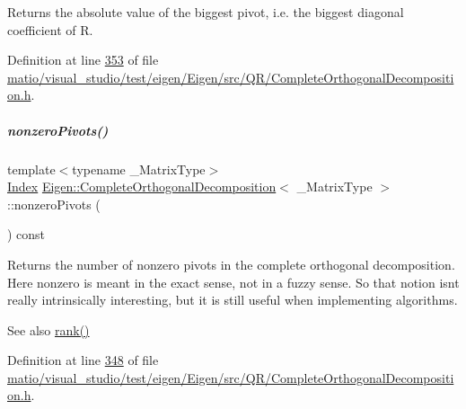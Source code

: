\begin{DoxyReturn}{Returns}
the absolute value of the biggest pivot, i.\+e. the biggest diagonal coefficient of R. 
\end{DoxyReturn}


Definition at line \hyperlink{matio_2visual__studio_2test_2eigen_2_eigen_2src_2_q_r_2_complete_orthogonal_decomposition_8h_source_l00353}{353} of file \hyperlink{matio_2visual__studio_2test_2eigen_2_eigen_2src_2_q_r_2_complete_orthogonal_decomposition_8h_source}{matio/visual\+\_\+studio/test/eigen/\+Eigen/src/\+Q\+R/\+Complete\+Orthogonal\+Decomposition.\+h}.

\mbox{\label{group___q_r___module_af9d7a5bdbc16a4a0bf7394ef0dd208da}} 
\subparagraph{\texorpdfstring{nonzero\+Pivots()}{nonzeroPivots()}\hspace{0.1cm}{\footnotesize\ttfamily [1/2]}}
{\footnotesize\ttfamily template$<$typename \+\_\+\+Matrix\+Type$>$ \\
\hyperlink{namespace_eigen_a62e77e0933482dafde8fe197d9a2cfde}{Index} \hyperlink{group___q_r___module_class_eigen_1_1_complete_orthogonal_decomposition}{Eigen\+::\+Complete\+Orthogonal\+Decomposition}$<$ \+\_\+\+Matrix\+Type $>$\+::nonzero\+Pivots (\begin{DoxyParamCaption}{ }\end{DoxyParamCaption}) const\hspace{0.3cm}{\ttfamily [inline]}}

\begin{DoxyReturn}{Returns}
the number of nonzero pivots in the complete orthogonal decomposition. Here nonzero is meant in the exact sense, not in a fuzzy sense. So that notion isn\textquotesingle{}t really intrinsically interesting, but it is still useful when implementing algorithms.
\end{DoxyReturn}
\begin{DoxySeeAlso}{See also}
\hyperlink{group___q_r___module_af348f64b26f8467a020062c22b748806}{rank()} 
\end{DoxySeeAlso}


Definition at line \hyperlink{matio_2visual__studio_2test_2eigen_2_eigen_2src_2_q_r_2_complete_orthogonal_decomposition_8h_source_l00348}{348} of file \hyperlink{matio_2visual__studio_2test_2eigen_2_eigen_2src_2_q_r_2_complete_orthogonal_decomposition_8h_source}{matio/visual\+\_\+studio/test/eigen/\+Eigen/src/\+Q\+R/\+Complete\+Orthogonal\+Decomposition.\+h}.

